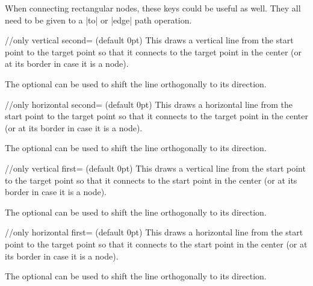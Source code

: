 When connecting rectangular nodes, these keys could be useful as well.
They all need to be given to a |to| or |edge| path operation.
\begin{stylekey}{/\tikzext/only vertical second= (default 0pt)}
This draws a vertical line from the start point to the target point so that
it connects to the target point in the center (or at its border in case it is a node).

The optional  can be used to shift the line orthogonally to its direction.
\end{stylekey}
\begin{stylekey}{/\tikzext/only horizontal second= (default 0pt)}
This draws a horizontal line from the start point to the target point so that
it connects to the target point in the center (or at its border in case it is a node).

The optional  can be used to shift the line orthogonally to its direction.
\end{stylekey}
\begin{stylekey}{/\tikzext/only vertical first= (default 0pt)}
This draws a vertical line from the start point to the target point so that
it connects to the start point in the center (or at its border in case it is a node).

The optional  can be used to shift the line orthogonally to its direction.
\end{stylekey}
\begin{stylekey}{/\tikzext/only horizontal first= (default 0pt)}
This draws a horizontal line from the start point to the target point so that
it connects to the start point in the center (or at its border in case it is a node).

The optional  can be used to shift the line orthogonally to its direction.
\end{stylekey}

